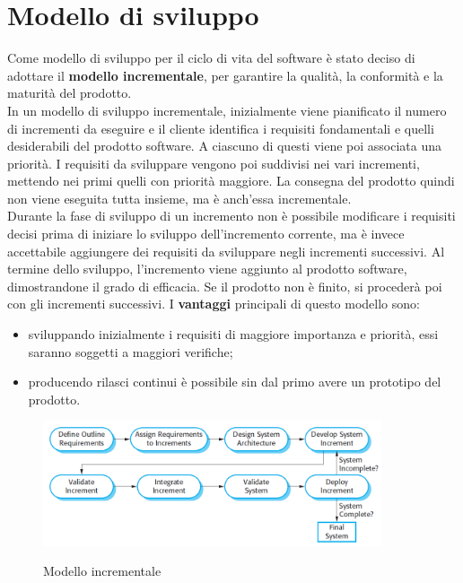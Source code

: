 \documentclass[PianoDiProgetto.tex]{subfiles}
\begin{document}
\chapter{Modello di sviluppo}
Come modello di sviluppo per il ciclo di vita del software è stato deciso di adottare il \textbf{modello incrementale}, per garantire la qualità, la conformità e la maturità del prodotto.\\
In un modello di sviluppo incrementale, inizialmente viene pianificato il numero di incrementi da eseguire e il cliente identifica i requisiti fondamentali e quelli desiderabili del prodotto software. A ciascuno di questi viene poi associata una priorità. I requisiti da sviluppare vengono poi suddivisi nei vari incrementi, mettendo nei primi quelli con priorità maggiore. La consegna del prodotto quindi non viene eseguita tutta insieme, ma è anch'essa incrementale.\\
Durante la fase di sviluppo di un incremento non è possibile modificare i requisiti decisi prima di iniziare lo sviluppo dell'incremento corrente, ma è invece accettabile aggiungere dei requisiti da sviluppare negli incrementi successivi. Al termine dello sviluppo, l'incremento viene aggiunto al prodotto software, dimostrandone il grado di efficacia. Se il prodotto non è finito, si procederà poi con gli incrementi successivi. I \textbf{vantaggi} principali di questo modello sono:
\begin{itemize}
	\item sviluppando inizialmente i requisiti di maggiore importanza e priorità, essi saranno soggetti a maggiori verifiche;
	\item producendo rilasci continui è possibile sin dal primo avere un prototipo del prodotto.
\end{itemize}

\begin{figure}[h]
	\centering
	\includegraphics[width=10cm]{images/modIncrementale.png}
	\label{fig:foo}
	\caption{Modello incrementale}
\end{figure} 
\end{document}
